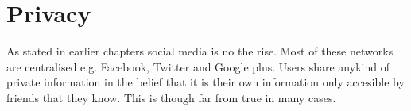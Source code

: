 \section{Privacy}
As stated in earlier chapters social media is no the rise.
Most of these networks are centralised e.g. Facebook, Twitter and Google plus.
Users share anykind of private information in the belief that it is their own information only accesible by friends that they know.
This is though far from true in many cases.
